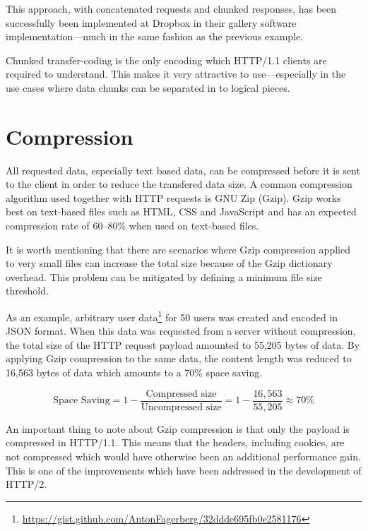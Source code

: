 \documentclass{cslthse-msc}
\begin{document}
This approach, with concatenated requests and chunked responses, has been successfully been implemented at Dropbox in their gallery software implementation\cite{dropbox_chunked}---much in the same fashion as the previous example.

Chunked transfer-coding is the only encoding which HTTP/1.1 clients are required to understand\cite{chunked_required}. This makes it very attractive to use---especially in the use cases where data chunks can be separated in to logical pieces.

\section{Compression}
\label{compression}

All requested data, especially text based data, can be compressed before it is sent to the client in order to reduce the transfered data size. A common compression algorithm used together with HTTP requests is GNU Zip (Gzip). Gzip works best on text-based files such as HTML, CSS and JavaScript and has an expected compression rate of 60--80\% when used on text-based files\cite[page 237]{HPBN}.

It is worth mentioning that there are scenarios where Gzip compression applied to very small files can increase the total size because of the Gzip dictionary overhead. This problem can be mitigated by defining a minimum file size threshold\cite{google_gzip}.

As an example, arbitrary user data\footnote{\url{https://gist.github.com/AntonFagerberg/32ddde695fb0e2581176}} for 50 users was created and encoded in JSON format. When this data was requested from a server without compression, the total size of the HTTP request payload amounted to 55,205 bytes of data. By applying Gzip compression to the same data, the content length was reduced to 16,563 bytes of data which amounts to a 70\% space saving. 

\begin{equation}
\mbox{Space Saving} = 1 - \frac{\mbox{Compressed size}}{\mbox{Uncompressed size}} = 1 - \frac{16,563}{55,205} \approx 70\%
\end{equation}

An important thing to note about Gzip compression is that only the payload is compressed in HTTP/1.1\cite{header_compression}. This means that the headers, including cookies, are not compressed which would have otherwise been an additional performance gain. This is one of the improvements which have been addressed in the development of HTTP/2\cite[page 222]{HPBN}.
\end{document}
